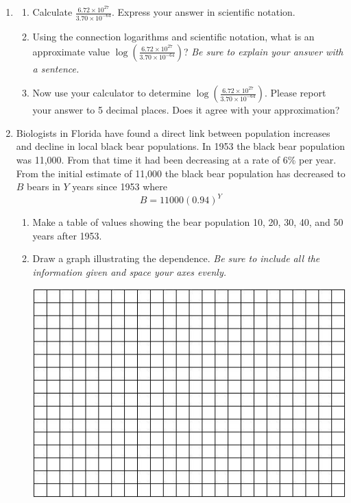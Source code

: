 \documentclass[12pt]{article}
\begin{document}
\newpage
\begin{enumerate}

\item \begin{enumerate}
\item Calculate $\displaystyle \frac{6.72 \times 10^{27}}{3.70 \times 10^{-64}} $. Express your answer in scientific notation.
\vfill
\item Using the connection logarithms and scientific notation, what is an approximate value $\displaystyle \log \left( \frac{6.72 \times 10^{27}}{3.70 \times 10^{-64}} \right)$?  \emph{Be sure to explain your answer with a sentence.}
\vfill
\item Now use your calculator to determine  $\displaystyle \log \left(\frac{6.72 \times 10^{27}}{3.70 \times 10^{-64}}  \right)$. Please report your answer to 5 decimal places.  Does it agree with your approximation?
\vfill
\end{enumerate}

\newpage


\item Biologists in Florida have found a direct link between population increases and decline in local black bear populations.  In 1953 the black bear population was 11,000.  From that time it had been decreasing at a rate of 6\% per year.  From the initial estimate of 11,000 the black bear population has decreased to $B$ bears in $Y$ years since 1953 where $$B=11000(0.94)^Y$$

\begin{enumerate}
\item Make a table of values showing the bear population 10, 20, 30, 40, and 50 years after 1953.  
\vfill
\item Draw a graph illustrating the dependence.  \emph{Be sure to include all the information given and space your axes evenly.}

\vspace{.1in}
\begin{center}
 {\includegraphics [width = 6in] {../GraphPaper}}
\end{center}
\vspace{.1in}


\end{enumerate}
\end{enumerate}
\end{document}
